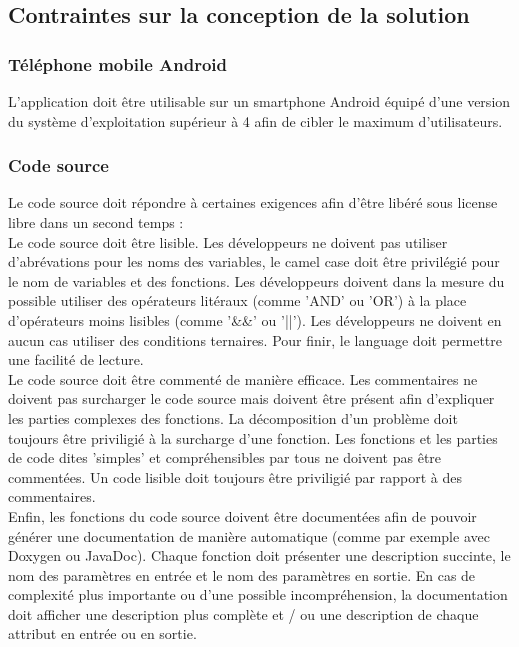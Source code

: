 \subsection{Contraintes sur la conception de la solution} %
\label{sub:contraintes_sur_la_conception_de_la_solution}

	\subsubsection{Téléphone mobile Android}
	L'application doit être utilisable sur un smartphone Android équipé d'une version du système d'exploitation supérieur à 4 afin de cibler le maximum d'utilisateurs.

	\subsubsection{Code source}
	Le code source doit répondre à certaines exigences afin d'être libéré sous license libre dans un second temps :\\

	Le code source doit être lisible. Les développeurs ne doivent pas utiliser d'abrévations pour les noms des variables, le camel case doit être privilégié pour le nom de variables et des fonctions. Les développeurs doivent dans la mesure du possible utiliser des opérateurs litéraux (comme 'AND' ou 'OR') à la place d'opérateurs moins lisibles (comme '\&\&' ou '||'). Les développeurs ne doivent en aucun cas utiliser des conditions ternaires. Pour finir, le language doit permettre une facilité de lecture.\\

	Le code source doit être commenté de manière efficace. Les commentaires ne doivent pas surcharger le code source mais doivent être présent afin d'expliquer les parties complexes des fonctions. La décomposition d'un problème doit toujours être priviligié à la surcharge d'une fonction. Les fonctions et les parties de code dites 'simples' et compréhensibles par tous ne doivent pas être commentées. Un code lisible doit toujours être priviligié par rapport à des commentaires.\\

	Enfin, les fonctions du code source doivent être documentées afin de pouvoir générer une documentation de manière automatique (comme par exemple avec Doxygen ou JavaDoc). Chaque fonction doit présenter une description succinte, le nom des paramètres en entrée et le nom des paramètres en sortie. En cas de complexité plus importante ou d'une possible incompréhension, la documentation doit afficher une description plus complète et / ou une description de chaque attribut en entrée ou en sortie.


